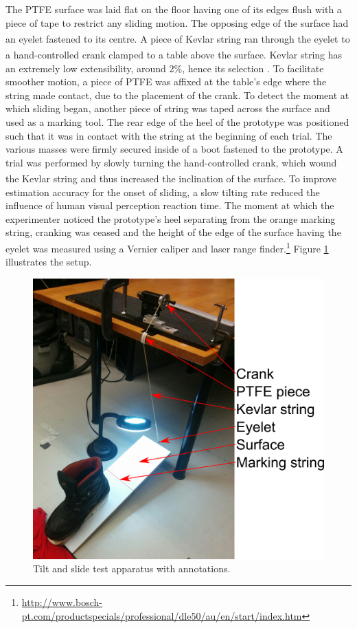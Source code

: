 \documentclass [12pt,letterpaper]{report}
\begin{document}
The PTFE surface was laid flat on the floor having one of its edges flush with a piece of tape to restrict any sliding motion. The opposing edge of the surface had an eyelet fastened to its centre. A piece of Kevlar\textsuperscript{\textregistered} string ran through the eyelet to a hand-controlled crank clamped to a table above the surface. Kevlar\textsuperscript{\textregistered} string has an extremely low extensibility, around 2\%, hence its selection \cite{Dupont2000}. To facilitate smoother motion, a piece of PTFE was affixed at the table's edge where the string made contact, due to the placement of the crank. To detect the moment at which sliding began, another piece of string was taped across the surface and used as a marking tool. The rear edge of the heel of the prototype was positioned such that it was in contact with the string at the beginning of each trial. The various masses were firmly secured inside of a boot fastened to the prototype. A trial was performed by slowly turning the hand-controlled crank, which wound the Kevlar\textsuperscript{\textregistered} string and thus increased the inclination of the surface. To improve estimation accuracy for the onset of sliding, a slow tilting rate reduced the influence of human visual perception reaction time. The moment at which the experimenter noticed the prototype's heel separating from the orange marking string, cranking was ceased and the height of the edge of the surface having the eyelet was measured using a Vernier caliper and laser range finder.\footnote{\url{http://www.bosch-pt.com/productspecials/professional/dle50/au/en/start/index.htm}} Figure \ref{tilt_apparatus_fiducial} illustrates the setup.

\newpage

\begin{figure}[tpb]
  \centering
  \includegraphics[scale=0.1]{fig/tilt_apparatus_fiducial}
  \caption{Tilt and slide test apparatus with annotations.}
  \label{tilt_apparatus_fiducial}
\end{figure} 
\end{document}
